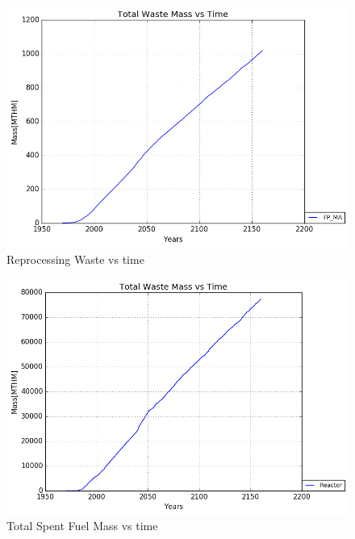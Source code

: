 \begin{figure}
	\includegraphics[width=\linewidth]{./images/stoprep_2020/FP_MA_total_Waste.png}
	\caption{Reprocessing Waste vs time}
	\label{fig:reprocess_rep_waste}
\end{figure}

\begin{figure}
	\includegraphics[width=\linewidth]{./images/stoprep_2020/Reactor_total_Waste.png}
	\caption{Total Spent Fuel Mass vs time}
	\label{fig:reprocess_reactor_waste}
\end{figure}

